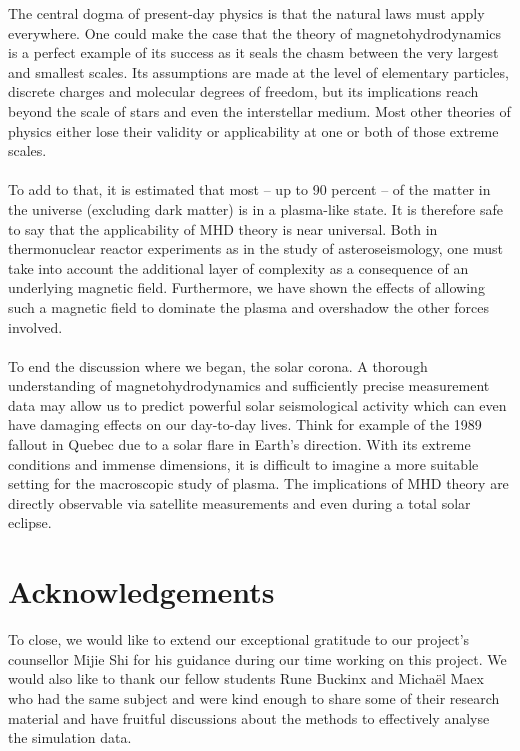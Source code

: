 The central dogma of present-day physics is that the natural laws must apply everywhere. 
One could make the case that the theory of magnetohydrodynamics is a perfect example of its success as it seals the chasm between the very largest and smallest scales. 
Its assumptions are made at the level of elementary particles, discrete charges and molecular degrees of freedom, but its implications reach beyond the scale of stars and even the interstellar medium. 
Most other theories of physics either lose their validity or applicability at one or both of those extreme scales.\\
\\
To add to that, it is estimated that most – up to 90 percent \cite{notes-principles-MHD}– of the matter in the universe (excluding dark matter) is in a plasma-like state. 
It is therefore safe to say that the applicability of MHD theory is near universal. 
Both in thermonuclear reactor experiments as in the study of asteroseismology, one must take into account the additional layer of complexity as a consequence of an underlying magnetic field. 
Furthermore, we have shown the effects of allowing such a magnetic field to dominate the plasma and overshadow the other forces involved.\\ 
\\
To end the discussion where we began, the solar corona. 
A thorough understanding of magnetohydrodynamics and sufficiently precise measurement data may allow us to predict powerful solar seismological activity which can even have damaging effects on our day-to-day lives. 
Think for example of the 1989 fallout in Quebec due to a solar flare in Earth’s direction. 
With its extreme conditions and immense dimensions, it is difficult to imagine a more suitable setting for the macroscopic study of plasma. 
The implications of MHD theory are directly observable via satellite measurements and even during a total solar eclipse.
 
 

\section*{Acknowledgements}
To close, we would like to extend our exceptional gratitude to our project’s counsellor Mijie Shi for his guidance during our time working on this project. 
We would also like to thank our fellow students Rune Buckinx and Michaël Maex who had the same subject and were kind enough to share some of their research material and have fruitful discussions about the methods to effectively analyse the simulation data.
